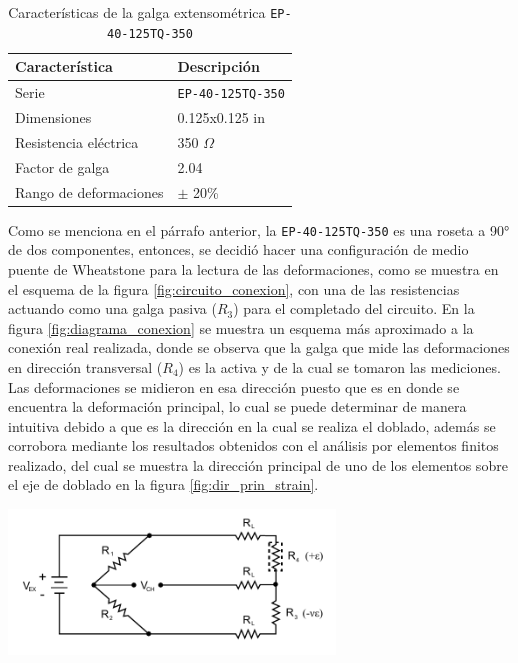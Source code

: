 \begin{table}[h]
\centering
\caption{Características de la galga extensométrica \texttt{EP-40-125TQ-350}}
\label{tab:strain_gage_props}
\begin{tabular}{p{6cm} p{4cm}} \hline
Característica & Descripción \\
\hline
Serie & \texttt{EP-40-125TQ-350} \\
Dimensiones & 0.125x0.125 in \\
Resistencia eléctrica &  350 $\Omega$  \\
Factor de galga & 2.04 \\
Rango de deformaciones & $\pm$ 20\% \\
\hline
\end{tabular}
\end{table}

Como se menciona en el párrafo anterior, la \texttt{EP-40-125TQ-350} es una roseta 
a 90° de dos componentes, entonces, se decidió hacer una configuración de 
medio puente de Wheatstone para la lectura de las deformaciones, como se muestra 
en el esquema de la figura \ref{fig:circuito_conexion}, con una de las resistencias 
actuando como una galga pasiva ($R_3$) para el completado del circuito. En la figura 
\ref{fig:diagrama_conexion} se muestra un esquema más aproximado a la conexión real 
realizada, donde se observa que la galga que mide las deformaciones en dirección 
transversal ($R_4$) es la activa y de la cual se tomaron las mediciones. Las deformaciones  
se midieron en esa dirección puesto que es en donde se encuentra la deformación 
principal, lo cual se puede determinar de manera intuitiva debido a que es la dirección 
en la cual se realiza el doblado, además se corrobora mediante los resultados obtenidos 
con el análisis por elementos finitos realizado, del cual se muestra la dirección 
principal de uno de los elementos sobre el eje de doblado en la figura \ref{fig:dir_prin_strain}.


\begin{center}
\includegraphics[width=0.65\textwidth]{src/ch3/circuito_conexion.pdf}
\label{fig:circuito_conexion}
\end{center}

